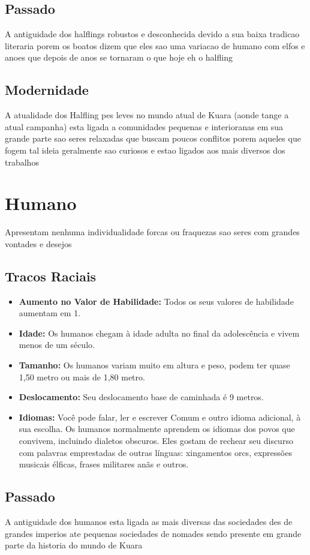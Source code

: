 \documentclass{book}
\begin{document}
\section{Passado}
A antiguidade dos halflings robustos e desconhecida devido a sua baixa tradicao literaria 
porem os boatos dizem que eles sao uma variacao de humano com elfos e anoes que depois de
anos se tornaram o que hoje eh o halfling
\section{Modernidade}
A atualidade dos Halfling pes leves no mundo atual de Kuara (aonde tange a atual campanha) 
esta ligada a comunidades pequenas e interioranas
em sua grande parte sao seres relaxadas que buscam poucos conflitos porem aqueles que 
fogem tal ideia geralmente sao curiosos e estao ligados aos mais diversos dos trabalhos

\chapter{Humano}
    Apresentam nenhuma individualidade forcas ou fraquezas sao seres com grandes vontades e 
    desejos
\section{Tracos Raciais}
\begin{itemize}
    \item \textbf{Aumento no Valor de Habilidade:} Todos os seus valores de habilidade 
          aumentam em 1.
    \item \textbf{Idade:} Os humanos chegam à idade adulta no final da adolescência e vivem 
          menos de um século.
    \item \textbf{Tamanho:} Os humanos variam muito em altura e peso, podem ter quase 1,50   
          metro ou mais de 1,80 metro.
    \item \textbf{Deslocamento:} Seu deslocamento base de caminhada é 9 metros.
    \item \textbf{Idiomas:} Você pode falar, ler e escrever Comum e outro idioma adicional, à  
          sua escolha. Os humanos normalmente aprendem os idiomas dos povos que
          convivem, incluindo dialetos obscuros. Eles gostam de rechear seu discurso com
          palavras emprestadas de outras línguas: xingamentos orcs, expressões musicais 
          élficas, frases militares anãs e outros.
\end{itemize}
\section{Passado}
A antiguidade dos humanos esta ligada as mais diversas das sociedades des de grandes imperios 
ate pequenas sociedades de nomades sendo presente em grande parte da historia do mundo de Kuara
\end{document}
